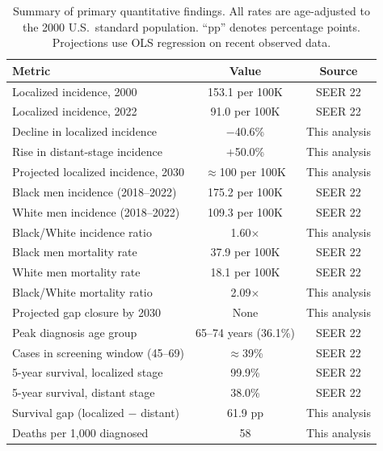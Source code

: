 \begin{table}[H]
    \centering
    \begin{tabular}{lcc}
    \hline
    \textbf{Metric} & \textbf{Value} & \textbf{Source} \\
    \hline
    Localized incidence, 2000 & 153.1 per 100K & SEER 22 \\
    Localized incidence, 2022 & 91.0 per 100K  & SEER 22 \\
    Decline in localized incidence & $-$40.6\%  & This analysis \\
    Rise in distant-stage incidence & $+$50.0\%  & This analysis \\
    Projected localized incidence, 2030 & $\approx$100 per 100K & This analysis \\
    \hline
    Black men incidence (2018--2022) & 175.2 per 100K & SEER 22 \\
    White men incidence (2018--2022) & 109.3 per 100K & SEER 22 \\
    Black/White incidence ratio & 1.60$\times$ & This analysis \\
    Black men mortality rate & 37.9 per 100K & SEER 22 \\
    White men mortality rate & 18.1 per 100K & SEER 22 \\
    Black/White mortality ratio & 2.09$\times$ & This analysis \\
    Projected gap closure by 2030 & None & This analysis \\
    \hline
    Peak diagnosis age group & 65--74 years (36.1\%) & SEER 22 \\
    Cases in screening window (45--69) & $\approx$39\% & SEER 22 \\
    \hline
    5-year survival, localized stage & 99.9\% & SEER 22 \\
    5-year survival, distant stage  & 38.0\% & SEER 22 \\
    Survival gap (localized $-$ distant) & 61.9 pp & This analysis \\
    Deaths per 1,000 diagnosed & 58 & This analysis \\
    \hline
    \end{tabular}
    \caption{Summary of primary quantitative findings. All rates are age-adjusted
    to the 2000 U.S.\ standard population. ``pp'' denotes percentage points.
    Projections use OLS regression on recent observed data.}
    \label{tab:summary}
\end{table}

